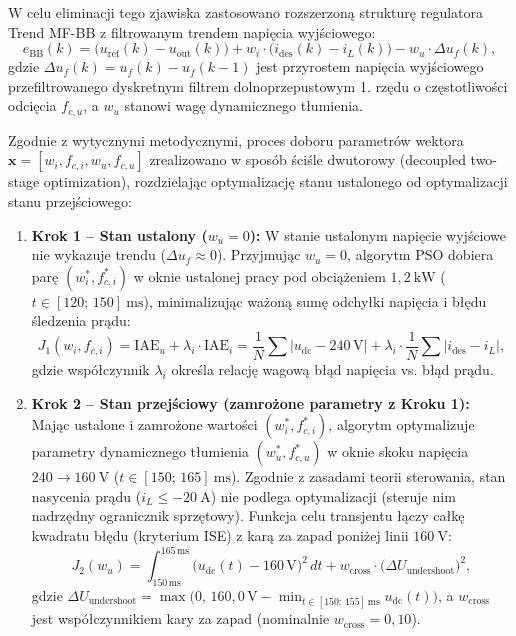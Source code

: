 W celu eliminacji tego zjawiska zastosowano rozszerzoną strukturę regulatora Trend MF-BB z filtrowanym trendem napięcia wyjściowego:
\begin{equation}
    e_{\mathrm{BB}}(k) = \bigl(u_{\mathrm{ref}}(k) - u_{\mathrm{out}}(k)\bigr) + w_i \cdot \bigl(i_{\mathrm{des}}(k) - i_L(k)\bigr) - w_u \cdot \Delta u_f(k),
    \label{eq:trend-mfbb-surface}
\end{equation}
gdzie $\Delta u_f(k) = u_f(k) - u_f(k-1)$ jest przyrostem napięcia wyjściowego przefiltrowanego dyskretnym filtrem dolnoprzepustowym 1. rzędu o częstotliwości odcięcia $f_{c,u}$, a $w_u$ stanowi wagę dynamicznego tłumienia.

Zgodnie z wytycznymi metodycznymi, proces doboru parametrów wektora $\mathbf{x} = [w_i, f_{c,i}, w_u, f_{c,u}]$ zrealizowano w sposób ściśle dwutorowy (decoupled two-stage optimization), rozdzielając optymalizację stanu ustalonego od optymalizacji stanu przejściowego:

\begin{enumerate}
    \item \textbf{Krok 1 -- Stan ustalony ($w_u = 0$):} W stanie ustalonym napięcie wyjściowe nie wykazuje trendu ($\Delta u_f \approx 0$). Przyjmując $w_u = 0$, algorytm PSO dobiera parę $(w_i^*, f_{c,i}^*)$ w oknie ustalonej pracy pod obciążeniem $1{,}2~\mathrm{kW}$ ($t \in [120;\, 150]~\mathrm{ms}$), minimalizując ważoną sumę odchyłki napięcia i błędu śledzenia prądu:
    \begin{equation}
        J_1(w_i, f_{c,i}) = \mathrm{IAE}_u + \lambda_i \cdot \mathrm{IAE}_i = \frac{1}{N}\sum |u_{\mathrm{dc}} - 240\,\mathrm{V}| + \lambda_i \cdot \frac{1}{N}\sum |i_{\mathrm{des}} - i_L|,
        \label{eq:cost-step1}
    \end{equation}
    gdzie współczynnik $\lambda_i$ określa relację wagową błąd napięcia vs. błąd prądu.
    \item \textbf{Krok 2 -- Stan przejściowy (zamrożone parametry z Kroku 1):} Mając ustalone i zamrożone wartości $(w_i^*, f_{c,i}^*)$, algorytm optymalizuje parametry dynamicznego tłumienia $(w_u^*, f_{c,u}^*)$ w oknie skoku napięcia $240 \to 160~\mathrm{V}$ ($t \in [150;\, 165]~\mathrm{ms}$). Zgodnie z zasadami teorii sterowania, stan nasycenia prądu ($i_L \le -20~\mathrm{A}$) nie podlega optymalizacji (steruje nim nadrzędny ogranicznik sprzętowy). Funkcja celu transjentu łączy całkę kwadratu błędu (kryterium ISE) z karą za zapad poniżej linii $160~\mathrm{V}$:
    \begin{equation}
        J_2(w_u) = \int_{150\,\mathrm{ms}}^{165\,\mathrm{ms}} \bigl(u_{\mathrm{dc}}(t) - 160\,\mathrm{V}\bigr)^2\, dt + w_{\mathrm{cross}} \cdot \bigl(\Delta U_{\mathrm{undershoot}}\bigr)^2,
        \label{eq:cost-step2}
    \end{equation}
    gdzie $\Delta U_{\mathrm{undershoot}} = \max\bigl(0,\, 160{,}0\,\mathrm{V} - \min_{t \in [150;\, 155]\,\mathrm{ms}} u_{\mathrm{dc}}(t)\bigr)$, a $w_{\mathrm{cross}}$ jest współczynnikiem kary za zapad (nominalnie $w_{\mathrm{cross}} = 0{,}10$).
\end{enumerate}

